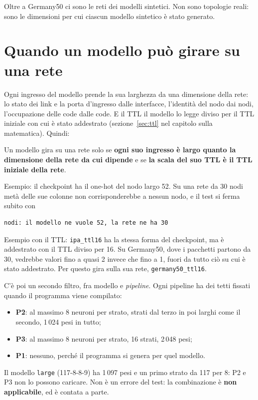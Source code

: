\documentclass[11pt,a4paper,oneside]{report}
\begin{document}
Oltre a Germany50 ci sono le reti dei modelli sintetici. Non sono topologie
reali: sono le dimensioni per cui ciascun modello sintetico è stato generato.

\section{Quando un modello può girare su una rete}

Ogni ingresso del modello prende la sua larghezza da una dimensione della rete:
lo stato dei link e la porta d'ingresso dalle interfacce, l'identità del nodo
dai nodi, l'occupazione delle code dalle code. E il TTL il modello lo legge
diviso per il TTL iniziale con cui è stato addestrato
(sezione~\ref{sec:ttl} nel capitolo sulla matematica). Quindi:

\begin{lezione}
Un modello gira su una rete solo se \textbf{ogni suo ingresso è largo quanto la
dimensione della rete da cui dipende} e se \textbf{la scala del suo TTL è il TTL
iniziale della rete}.
\end{lezione}

Esempio: il checkpoint ha il one-hot del nodo largo 52. Su una rete da 30 nodi
metà delle sue colonne non corrisponderebbe a nessun nodo, e il test si ferma
subito con
\begin{lstlisting}
nodi: il modello ne vuole 52, la rete ne ha 30
\end{lstlisting}
Esempio con il TTL: \texttt{ipa\_ttl16} ha la stessa forma del checkpoint, ma è
addestrato con il TTL diviso per 16. Su Germany50, dove i pacchetti partono da
30, vedrebbe valori fino a quasi 2 invece che fino a 1, fuori da tutto ciò su
cui è stato addestrato. Per questo gira sulla sua rete, \texttt{germany50\_ttl16}.

C'è poi un secondo filtro, fra modello e \emph{pipeline}. Ogni pipeline ha dei
tetti fissati quando il programma viene compilato:
\begin{itemize}
  \item \textbf{P2}: al massimo 8 neuroni per strato, strati dal terzo in poi
        larghi come il secondo, 1\,024 pesi in tutto;
  \item \textbf{P3}: al massimo 8 neuroni per strato, 16 strati, 2\,048 pesi;
  \item \textbf{P1}: nessuno, perché il programma si genera per quel modello.
\end{itemize}
Il modello \texttt{large} (117-8-8-9) ha 1\,097 pesi e un primo strato da 117
per 8: P2 e P3 non lo possono caricare. Non è un errore del test: la
combinazione è \textbf{non applicabile}, ed è contata a parte.
\end{document}
